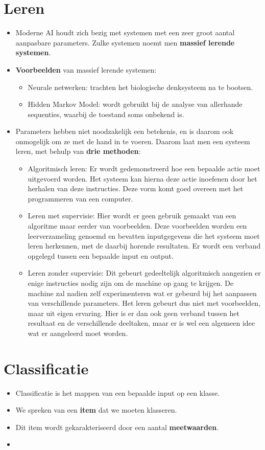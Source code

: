 \documentclass{report}
\begin{document}
\section{Leren}
\begin{itemize}
	\item Moderne AI houdt zich bezig met systemen met een zeer groot aantal aanpasbare parameters. Zulke systemen noemt men \textbf{massief lerende systemen}.
	\item \textbf{Voorbeelden} van massief lerende systemen:
	\begin{itemize}
		\item Neurale netwerken: trachten het biologische denksysteem na te bootsen.
		\item Hidden Markov Model: wordt gebruikt bij de analyse van allerhande sequenties, waarbij de toestand soms onbekend is.
	\end{itemize}
	\item Parameters hebben niet noodzakelijk een betekenis, en is daarom ook onmogelijk om ze met de hand in te voeren. Daarom laat men een systeem leren, met behulp van \textbf{drie methoden}:
	\begin{itemize}
		\item Algoritmisch leren: Er wordt gedemonstreerd hoe een bepaalde actie moet uitgevoerd worden. Het systeem kan hierna deze actie inoefenen door het herhalen van deze instructies. Deze vorm komt goed overeen met het programmeren van een computer.
		\item Leren met supervisie: Hier wordt er geen gebruik gemaakt van een algoritme maar eerder van voorbeelden. Deze voorbeelden worden een leerverzameling genoemd en bevatten inputgegevens die het systeem moet leren herkennen, met de daarbij horende resultaten. Er wordt een verband opgelegd tussen een bepaalde input en output.
		\item Leren zonder supervisie: Dit gebeurt gedeeltelijk algoritmisch aangezien er enige instructies nodig zijn om de machine op gang te krijgen. De machine zal nadien zelf experimenteren wat er gebeurd bij het aanpassen van verschillende parameters. Het leren gebeurt dus niet met voorbeelden, maar uit eigen ervaring. Hier is er dan ook geen verband tussen het resultaat en de verschillende deeltaken, maar er is wel een algemeen idee wat er aangeleerd moet worden.
	\end{itemize}
\end{itemize}
\section{Classificatie}
\begin{itemize}
	\item Classificatie is het mappen van een bepaalde input op een klasse.
	\item We spreken van een \textbf{item} dat we moeten klasseren.
	\item Dit item wordt gekarakteriseerd door een aantal \textbf{meetwaarden}.
	\item {}
\end{itemize}
\end{document}
